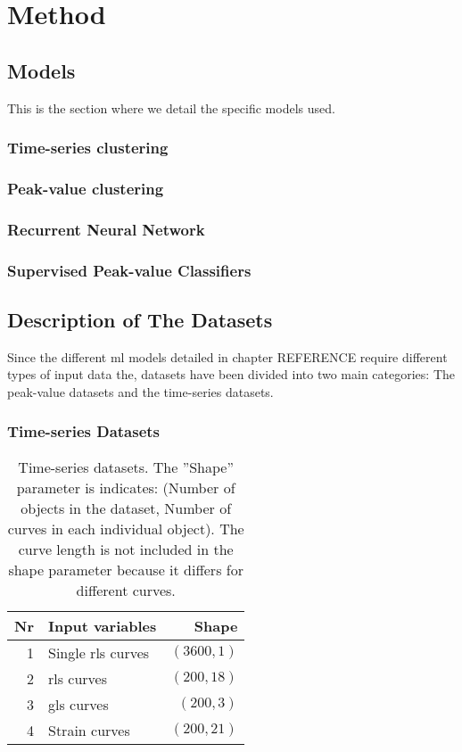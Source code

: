 \chapter{Method}

\section{Models} 
This is the section where we detail the specific models used. \bigskip

\subsection{Time-series clustering}

\subsection{Peak-value clustering}

\subsection{Recurrent Neural Network}

\subsection{Supervised Peak-value Classifiers}

\section{Description of The Datasets}

Since the different \acrshort{ml} models detailed in chapter REFERENCE require different types of input data the, datasets have been divided into two main categories: 
The peak-value datasets and the time-series datasets. \bigskip

\subsection{Time-series Datasets}

\begin{table*}[h]
    \centering
    \begin{tabular}{ rlr }
        \toprule
        Nr & Input variables   & Shape \\
        \midrule
        1  & Single \acrshort{rls} curves & $(3600,1)$ \\
        2  & \acrshort{rls} curves        & $(200,18)$ \\
        3  & \acrshort{gls} curves        & $(200,3)$  \\
        4  & Strain curves                & $(200,21)$ \\
        \bottomrule
    \end{tabular}
    \caption{Time-series datasets. The ''Shape'' parameter is indicates: (Number of objects in the dataset, Number of curves in each individual object). The curve length is not included in the shape parameter because it differs for different curves.}
    \label{tab:ts_dsets}
\end{table*}

